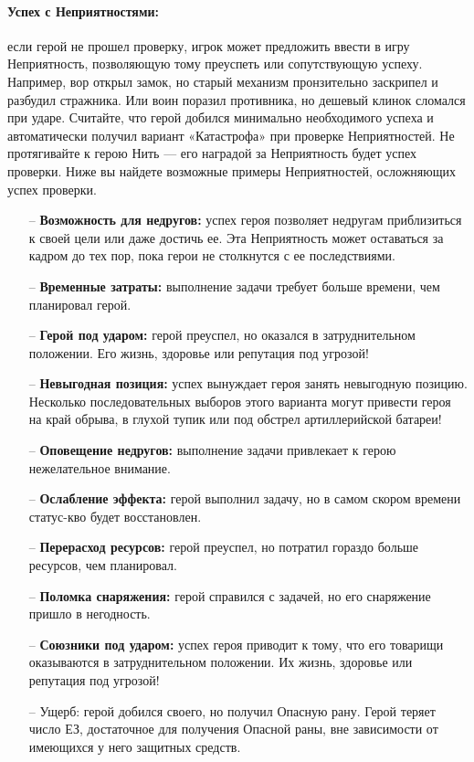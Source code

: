 \paragraph{Успех с Неприятностями:} если герой не прошел проверку, игрок может предложить ввести в игру Неприятность, позволяющую тому преуспеть или сопутствующую успеху. Например, вор открыл замок, но старый механизм пронзительно заскрипел и разбудил стражника. Или воин поразил противника, но дешевый клинок сломался при ударе. Считайте, что герой добился минимально необходимого успеха и автоматически получил вариант «Катастрофа» при проверке Неприятностей. Не протягивайте к герою Нить — его наградой за Неприятность будет успех проверки. Ниже вы найдете возможные примеры Неприятностей, осложняющих успех проверки.
\begin{itemize}
\item[--] \textbf{Возможность для недругов:} успех героя позволяет недругам приблизиться к своей цели или даже достичь ее. Эта Неприятность может оставаться за кадром до тех пор, пока герои не столкнутся с ее последствиями.
\item[--] \textbf{Временные затраты:} выполнение задачи требует больше времени, чем планировал герой.
\item[--] \textbf{Герой под ударом:} герой преуспел, но оказался в затруднительном положении. Его жизнь, здоровье или репутация под угрозой!
\item[--] \textbf{Невыгодная позиция:} успех вынуждает героя занять невыгодную позицию. Несколько последовательных выборов этого варианта могут привести героя на край обрыва, в глухой тупик или под обстрел артиллерийской батареи!
\item[--] \textbf{Оповещение недругов:} выполнение задачи привлекает к герою нежелательное внимание.
\item[--] \textbf{Ослабление эффекта:} герой выполнил задачу, но в самом скором времени статус-кво будет восстановлен.
\item[--] \textbf{Перерасход ресурсов:} герой преуспел, но потратил гораздо больше ресурсов, чем планировал.
\item[--] \textbf{Поломка снаряжения:} герой справился с задачей, но его снаряжение пришло в негодность.
\item[--] \textbf{Союзники под ударом:} успех героя приводит к тому, что его товарищи оказываются в затруднительном положении. Их жизнь, здоровье или репутация под угрозой!
\item[--] Ущерб: герой добился своего, но получил Опасную рану. Герой теряет число ЕЗ, достаточное для получения Опасной раны, вне зависимости от имеющихся у него защитных средств.
\end{itemize}

